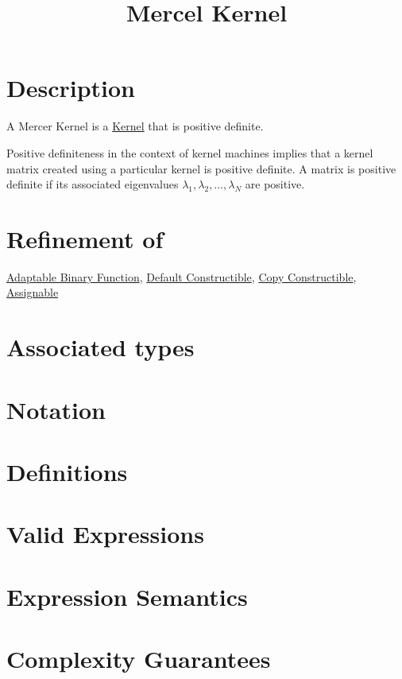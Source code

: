 \documentclass{article}
\begin{document}
\title{Mercel Kernel}
\maketitle

\section*{Description}

A Mercer Kernel is a \href{\kmlroot/kernel.html}{Kernel} that is positive definite.

Positive definiteness in the context of kernel machines implies that a kernel matrix created using 
a particular kernel is positive definite. A matrix is positive definite if its associated eigenvalues
$\lambda_1,\lambda_2,\ldots,\lambda_N$ are positive.


\section*{Refinement of}

\href{http://www.sgi.com/tech/stl/AdaptableBinaryFunction.html}{Adaptable Binary Function}, 
\href{http://www.sgi.com/tech/stl/DefaultConstructible.html}{Default Constructible}, 
\href{http://www.boost.org/doc/html/CopyConstructible.html}{Copy Constructible},
\href{http://www.sgi.com/tech/stl/Assignable.html}{Assignable}

\section*{Associated types}

\section*{Notation}
\section*{Definitions}
\section*{Valid Expressions}
\section*{Expression Semantics}

\section*{Complexity Guarantees}
\end{document}
